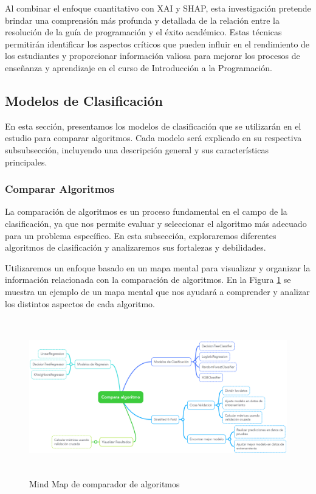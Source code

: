 Al combinar el enfoque cuantitativo con XAI y SHAP, esta investigación pretende brindar una comprensión más profunda y detallada de la relación entre la resolución de la guía de programación y el éxito académico. Estas técnicas permitirán identificar los aspectos críticos que pueden influir en el rendimiento de los estudiantes y proporcionar información valiosa para mejorar los procesos de enseñanza y aprendizaje en el curso de Introducción a la Programación.

\subsection{Modelos de Clasificación}

En esta sección, presentamos los modelos de clasificación que se utilizarán en el estudio para comparar algoritmos. Cada modelo será explicado en su respectiva subsubsección, incluyendo una descripción general y sus características principales.

\subsubsection{Comparar Algoritmos}

La comparación de algoritmos es un proceso fundamental en el campo de la clasificación, ya que nos permite evaluar y seleccionar el algoritmo más adecuado para un problema específico. En esta subsección, exploraremos diferentes algoritmos de clasificación y analizaremos sus fortalezas y debilidades.

Utilizaremos un enfoque basado en un mapa mental para visualizar y organizar la información relacionada con la comparación de algoritmos. En la Figura \ref{fig:mindMap_comparaAlgoritmos} se muestra un ejemplo de un mapa mental que nos ayudará a comprender y analizar los distintos aspectos de cada algoritmo.


\begin{figure}[H]
  \centering
  \includegraphics[width=6.06111in,height=2.68611in]{img/compara_algoritmos/comparaAlgoritmoCompletoMindMap.png}
  \caption{Mind Map de comparador de algoritmos}
  \label{fig:mindMap_comparaAlgoritmos}
\end{figure}


